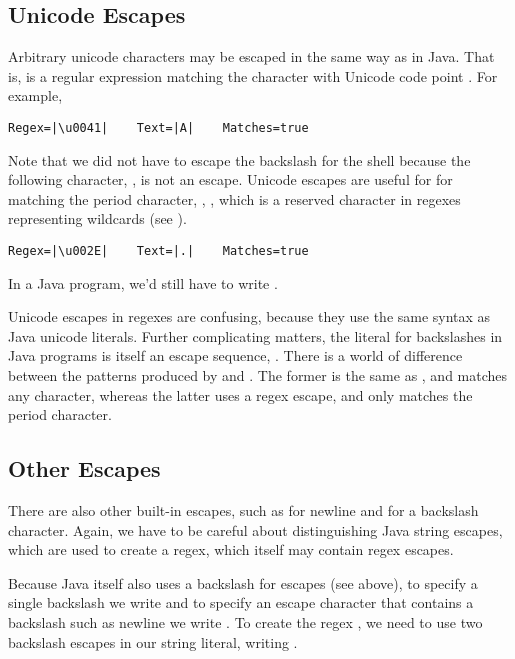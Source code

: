 \subsection{Unicode Escapes}

Arbitrary unicode characters may be escaped in the same way as in
Java.  That is,  is a regular expression
matching the character with Unicode code point
.  For example,
%
%
\begin{verbatim}
Regex=|\u0041|    Text=|A|    Matches=true
\end{verbatim}
%
Note that we did not have to escape the backslash for the shell
because the following character, , is not an escape.  Unicode
escapes are useful for for matching the period character,
, , which is a reserved character
in regexes representing wildcards (see ).
%
%
\begin{verbatim}
Regex=|\u002E|    Text=|.|    Matches=true
\end{verbatim}
%

In a Java program, we'd still have to write
.  

Unicode escapes in regexes are confusing, because they use the same
syntax as Java unicode literals.  Further complicating matters, the
literal for backslashes in Java programs is itself an escape sequence,
\code{{\bk}{\bk}}.  There is a world of difference between the
patterns produced by  and
.  The former is the same
as , and matches any character, whereas
the latter uses a regex escape, and only matches the period
character.

\subsection{Other Escapes}

There are also other built-in escapes, such as  for
newline and \code{\bk\bk} for a backslash character.  Again, we have
to be careful about distinguishing Java string escapes, which are used
to create a regex, which itself may contain regex escapes.  

Because Java itself also uses a backslash for escapes (see above),
to specify a single backslash we write \code{\bk\bk} and 
to specify an escape character that contains a backslash such as newline 
 we write .  To create the regex \code{\bk\bk}, 
we need to use two backslash escapes in our string literal, writing
.  

